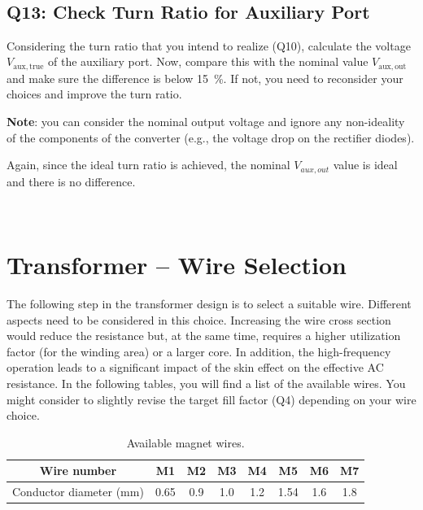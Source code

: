 \documentclass{PELsmallreport}
\begin{document}
  \hfill{}\\



\subsection{Q13: Check Turn Ratio for Auxiliary Port} 
Considering the turn ratio that you intend to realize (Q10), calculate the voltage $V_\mathrm{aux,true}$ of the auxiliary port. 
Now, compare this with the nominal value $V_\mathrm{aux,out}$ and make sure the difference is below \qty{15}{\percent}. 
If not, you need to reconsider your choices and improve the turn ratio.  

\textbf{Note}: you can consider the nominal output voltage and ignore any non-ideality of the components of the converter (e.g., the voltage drop on the rectifier diodes). 




\begin{framed}
	\vspace{2em}
	Again, since the ideal turn ratio is achieved, the nominal \(V_{aux,out}\) value is ideal and there is no difference.
	\vspace{2em}
\end{framed}

  \hfill{}\\








\newpage
\section{Transformer -- Wire Selection}

The following step in the transformer design is to select a suitable wire.
Different aspects need to be considered in this choice. 
Increasing the wire cross section would reduce the resistance but, at the same time, requires a higher utilization factor (for the winding area) or a larger core. 
In addition, the high-frequency operation leads to a significant impact of the skin effect on the effective AC resistance. 
In the following tables, you will find a list of the available wires. 
You might consider to slightly revise the target fill factor (Q4) depending on your wire choice. 

\begin{table}[H]
\centering
\caption{Available magnet wires.}
\label{tab:availablewiresBare}
\begin{tabular}{cccccccc}
	\toprule
	Wire number & M1 & M2 & M3 & M4 & M5 & M6 & M7 \\
	\midrule
	Conductor diameter ($\mathrm{mm}$) & 0.65 & 0.9 & 1.0 & 1.2 & 1.54 & 1.6 & 1.8 \\
	\bottomrule
\end{tabular}
\end{table}
\end{document}
